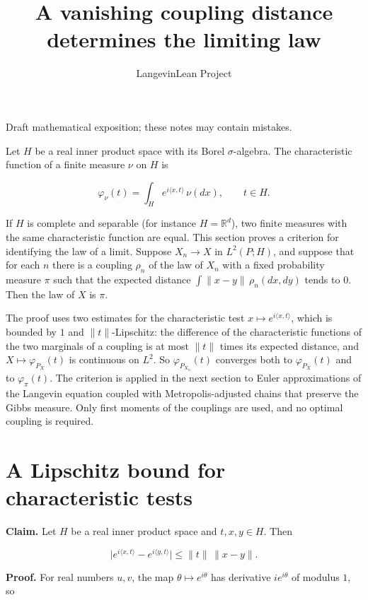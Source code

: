 \documentclass[11pt,a4paper]{article}
\title{\texorpdfstring{A vanishing coupling distance determines the limiting law}{A vanishing coupling distance determines the limiting law}}
\author{LangevinLean Project}
\date{}
\begin{document}
\maketitle
Draft mathematical exposition; these notes may contain mistakes.


Let \(H\) be a real inner product space with its Borel \(\sigma\)-algebra. The characteristic function of a finite measure \(\nu\) on \(H\) is


\[\varphi_\nu(t)=\int_He^{i\langle x,t\rangle}\,\nu(dx),\qquad t\in H.\]


If \(H\) is complete and separable (for instance \(H=\mathbb R^d\)), two finite measures with the same characteristic function are equal. This section proves a criterion for identifying the law of a limit. Suppose \(X_n\to X\) in \(L^2(P;H)\), and suppose that for each \(n\) there is a coupling \(\rho_n\) of the law of \(X_n\) with a fixed probability measure \(\pi\) such that the expected distance \(\int\|x-y\|\,\rho_n(dx,dy)\) tends to \(0\). Then the law of \(X\) is \(\pi\).




The proof uses two estimates for the characteristic test \(x\mapsto e^{i\langle x,t\rangle}\), which is bounded by \(1\) and \(\|t\|\)-Lipschitz: the difference of the characteristic functions of the two marginals of a coupling is at most \(\|t\|\) times its expected distance, and \(X\mapsto\varphi_{P_X}(t)\) is continuous on \(L^2\). So \(\varphi_{P_{X_n}}(t)\) converges both to \(\varphi_{P_X}(t)\) and to \(\varphi_\pi(t)\). The criterion is applied in the next section to Euler approximations of the Langevin equation coupled with Metropolis-adjusted chains that preserve the Gibbs measure. Only first moments of the couplings are used, and no optimal coupling is required.


\section{\texorpdfstring{A Lipschitz bound for characteristic tests}{A Lipschitz bound for characteristic tests}}


\textbf{Claim.} Let \(H\) be a real inner product space and \(t,x,y\in H\). Then


\[\bigl|e^{i\langle x,t\rangle}-e^{i\langle y,t\rangle}\bigr|\le\|t\|\,\|x-y\|.\]


\textbf{Proof.} For real numbers \(u,v\), the map \(\theta\mapsto e^{i\theta}\) has derivative \(ie^{i\theta}\) of modulus \(1\), so
\end{document}
